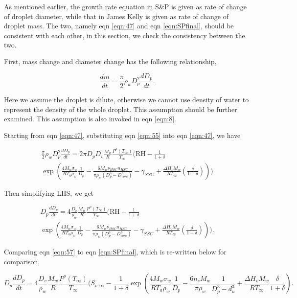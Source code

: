 \documentclass[12pt]{amsart}
\begin{document}
As mentioned earlier,  the growth rate equation in S\&P is given as rate of change of droplet diameter, while that in James Kelly is given as rate of change of droplet mass.  The two, namely eqn \ref{eqn:47} and eqn \ref{eqn:SPfinal}, should be consistent with each other, in this section, we check the consistency between the two.

First, mass change and diameter change has the following relationship,

\begin{equation}\label{eqn:55}
\frac{dm}{dt}=\frac{\pi}{2}\rho_wD_{p}^{2}\frac{dD_{p}}{dt}.
\end{equation}

Here we assume the droplet is dilute, otherwise we cannot use density of water to represent the density of the whole droplet.
This assumption should be further examined. This assumption is also invoked in eqn \ref{eqn:8}.

Starting from eqn \ref{eqn:47}, substituting eqn \ref{eqn:55} into eqn \ref{eqn:47},  we have 

\begin{eqnarray}\label{eqn:56}
\frac{\pi}{2}\rho_wD_{p}^{2}\frac{dD_{p}}{dt}=2 \pi D_{p} D_{v}  \frac{M_{w}}{R} \frac{P^{o}(T_{\infty})} {T_{\infty}} (\textrm{RH} - \frac{1}{1+\delta}  \\ \nonumber
\exp( \frac{4 M_{w}\sigma_{w}}{R T_{a} \rho_w}\frac{1}{D_{p}}-\frac{6M_{w}\nu_{HSC}n_{HSC}}{\pi \rho_{w}(D_{p}^{3}-D_{core}^{3})}-\gamma_{SSC}+\frac{\Delta H_{v} M_{w}}{R T_{\infty}} (\frac{\delta}{1+\delta})))  \nonumber
\end{eqnarray}

Then simplifying LHS, we get 

\begin{eqnarray}\label{eqn:57}
D_{p}\frac{dD_{p}}{dt}=4 \frac{D_{v}}{\rho_{w}}  \frac{M_{w}}{R} \frac{P^{o}(T_{\infty})} {T_{\infty}} (\textrm{RH} - \frac{1}{1+\delta}  \\ \nonumber
\exp( \frac{4 M_{w}\sigma_{w}}{R T_{a} \rho_w}\frac{1}{D_{p}}-\frac{6M_{w}\nu_{HSC}n_{HSC}}{\pi \rho_{w}(D_{p}^{3}-D_{core}^{3})}-\gamma_{SSC}+\frac{\Delta H_{v} M_{w}}{R T_{\infty}} (\frac{\delta}{1+\delta}))).  \nonumber
\end{eqnarray}

Comparing eqn \ref{eqn:57} to eqn \ref{eqn:SPfinal}, which is re-written below for comparison,

\begin{equation}
D_{p}\frac{dD_{p}}{dt}=4 \frac{D_{v}} {\rho_{w}} \frac{M_{w}}{R} \frac{P^{o}(T_{\infty})} {T_{\infty}} (S_{v, \infty} - \frac{1}{1+\delta} \exp(\frac{4 M_{w}\sigma_{w}}{R T_{a} \rho_w}\frac{1}{D_{p}}-\frac{6 n_{s} M_{w}}{\pi \rho_{w}} \frac{1}{D_{p}^{3}-d_{u}^{3}}+\frac{\Delta H_{v} M_{w}}{R T_{\infty}} \frac{\delta}{1+\delta}). \nonumber
\end{equation} 
\end{document}
